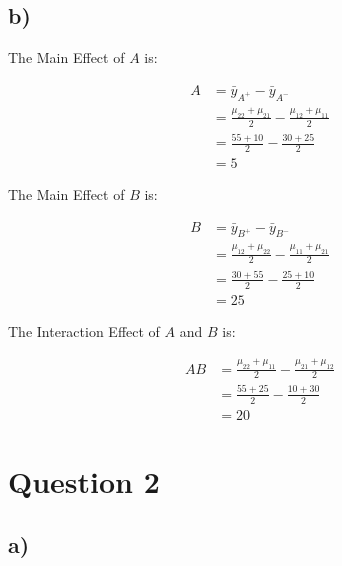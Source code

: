 \documentclass{article}
\begin{document}
\subsection*{b)}
\begin{flushleft}
The Main Effect of $A$ is:
\end{flushleft}
\begin{align*}
    A & = \bar{y}_{A^{+}} - \bar{y}_{A^{-}} \\
      & = \frac{\mu_{22} + \mu_{21}}{2} - \frac{\mu_{12} + \mu_{11}}{2} \\
      & = \frac{55 + 10}{2} - \frac{30 + 25}{2} \\
      & = 5
\end{align*}
\begin{flushleft}
The Main Effect of $B$ is:
\end{flushleft}
\begin{align*}
    B & = \bar{y}_{B^{+}} - \bar{y}_{B^{-}} \\
      & = \frac{\mu_{12} + \mu_{22}}{2} - \frac{\mu_{11} + \mu_{21}}{2} \\
      & = \frac{30 + 55}{2} - \frac{25 + 10}{2} \\
      & = 25
\end{align*}
\clearpage
\begin{flushleft}
The Interaction Effect of $A$ and $B$ is:
\end{flushleft}
\begin{align*}
    AB & = \frac{\mu_{22} + \mu_{11}}{2} - \frac{\mu_{21} + \mu_{12}}{2} \\
       & = \frac{55 + 25}{2} - \frac{10 + 30}{2} \\
       & = 20
\end{align*}

\section*{Question 2}

\subsection*{a)}
\end{document}

